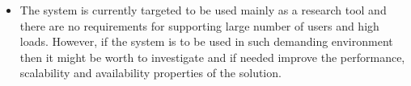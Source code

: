 \begin{itemize}
\item The system is currently targeted to be used mainly as a research tool and there are no requirements for supporting large number of users and high loads. However, if the system is to be used in such demanding environment then it might be worth to investigate and if needed improve the performance, scalability and availability properties of the solution.


\end{itemize}

